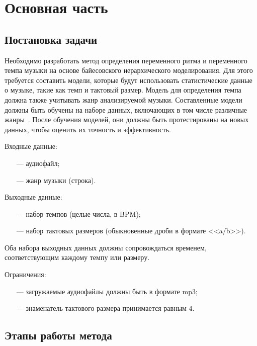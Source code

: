\section{Основная часть}

\subsection{Постановка задачи}

Необходимо разработать метод определения переменного ритма и переменного темпа музыки на основе байесовского иерархического моделирования. Для этого требуется составить модели, которые будут использовать статистические данные о музыке, такие как темп и тактовый размер. Модель для определения темпа должна также учитывать жанр анализируемой музыки. Составленные модели должны быть обучены на наборе данных, включающих в том числе различные жанры~\cite{dataset}. После обучения моделей, они должны быть протестированы на новых данных, чтобы оценить их точность и эффективность.

Входные данные:

\begin{itemize}
	\item[---] аудиофайл;
	\item[---] жанр музыки (строка).
\end{itemize}

Выходные данные:

\begin{itemize}
	\item[---] набор темпов (целые числа, в BPM);
	\item[---] набор тактовых размеров (обыкновенные дроби в формате <<a/b>>).
\end{itemize}

Оба набора выходных данных должны сопровождаться временем, соответствующим каждому темпу или размеру.

Ограничения:

\begin{itemize}
	\item[---] загружаемые аудиофайлы должны быть в формате mp3;
	\item[---] знаменатель тактового размера принимается равным 4.
\end{itemize}

\subsection{Этапы работы метода}

